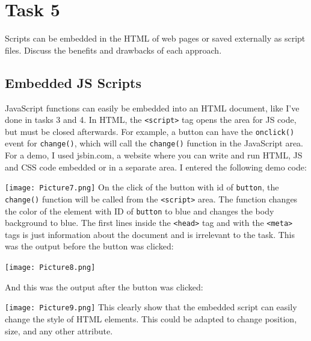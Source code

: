 \documentclass[a4paper]{article}
\begin{document}
\newpage
\section{Task 5}
Scripts can be embedded in the HTML of web pages or saved externally as script files. Discuss the benefits and drawbacks of each approach.
\subsection{Embedded JS Scripts}
JavaScript functions can easily be embedded into an HTML document, like I've done in tasks 3 and 4. In HTML, the \verb|<script>| tag opens the area for JS code, but must be closed afterwards. For example, a button can have the \verb|onclick()| event for \verb|change()|, which will call the \verb|change()| function in the JavaScript area. For a demo, I used jsbin.com, a website where you can write and run HTML, JS and CSS code embedded or in a separate area. I entered the following demo code: \par
\noindent\texttt{[image: Picture7.png]}
On the click of the button with id of \verb|button|, the \verb|change()| function will be called from the \verb|<script>| area. The function changes the color of the element with ID of \verb|button| to blue and changes the body background to blue. The first lines inside the \verb|<head>| tag and with the \verb|<meta>| tags is just information about the document and is irrelevant to the task. This was the output before the button was clicked: \par
\noindent\texttt{[image: Picture8.png]}\par \newpage
And this was the output after the button was clicked: \par
\noindent\texttt{[image: Picture9.png]}
This clearly show that the embedded script can easily change the style of HTML elements. This could be adapted to change position, size, and any other attribute. \newpage
\end{document}

